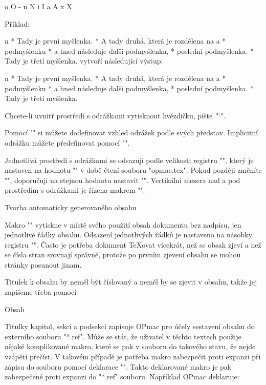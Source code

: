 \begtt
\style o %
\style O %
\style - %
\style n %
\style N %
\style i %
\style I %
\style a %
\style A %
\style x %
\style X %
\endtt

Příklad:

\begtt
\begitems \style n
* Tady je první myšlenka.
* A tady druhá, která je rozdělena na
  \begitems \style a
  * podmyšlenku
  * a hned následuje další podmyšlenka,
  * poslední podmyšlenka.
  \enditems
* Tady je třetí myšlenka.
\enditems
\endtt
%
vytvoří následující výstup:

\begitems \style n
* Tady je první myšlenka.
* A tady druhá, která je rozdělena na
  \begitems \style a
  * podmyšlenku
  * a hned následuje další podmyšlenka,
  * poslední podmyšlenka.
  \enditems
* Tady je třetí myšlenka.
\enditems

Chcete-li uvnitř prostředí s odrážkami vytisknout hvězdičku, pište~"\char`\*".

Pomocí "" si můžete dodefinovat vzhled odrážek
podle svých představ. Implicitní odrážku můžete předefinovat pomocí
"\def\normalitem{<text>}".

Jednotlivá prostředí s odrážkami se odsazují podle
velikosti registru "\iindent", který je nastaven na hodnotu "\parindent" v
době čtení souboru "opmac.tex". Pokud později změníte "\parindent",
doporučuji na stejnou hodnotu nastavit "\iindent".
Vertikální mezera nad a pod prostředím s odrážkami je řízena makrem
"\iiskip".

\sec Tvorba automaticky generovaného obsahu

Makro "\maketoc" vytiskne v místě svého použití obsah dokumentu bez nadpisu,
jen jednotlivé řádky obsahu. Odsazení jednotlivých řádků je nastaveno na
násobky registru "\iindent". Často je potřeba dokument \TeX{}ovat vícekrát,
než se obsah zjeví a než se čísla stran srovnají správně, protože po
prvním zjevení obsahu se mohou stránky posunout jinam.

Titulek k obsahu by neměl být číslovaný a neměl by se zjevit v obsahu, takže
jej zapíšeme třeba pomocí

\begtt
\nonum\notoc\sec Obsah
\endtt

Titulky kapitol, sekcí a podsekcí zapisuje OPmac pro účely sestavení obsahu do
externího souboru "*.ref". Může se stát, že uživatel v těchto textech
použije nějaké komplikované makro, které se pak v souboru  do
takového stavu, že nejde vzápětí přečíst. V takovém případě je potřeba
makro zabezpečit proti expanzi při zápisu do souboru pomocí
deklarace "\addprotect\makro". Takto deklarované makro je pak zabezpečené
proti expanzi do "*.ref" souboru. Například OPmac deklaruje:

